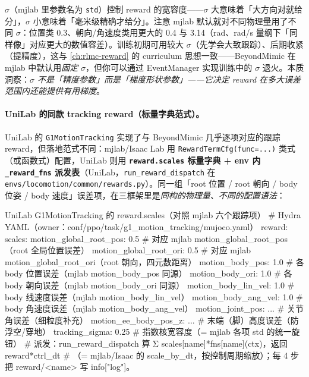 \begin{insight}\label{ins:rlmc-imit-sigma}
$\sigma$（mjlab 里参数名为 \texttt{std}）控制 reward 的宽容度——$\sigma$ 大意味着「大方向对就给分」，$\sigma$ 小意味着「毫米级精确才给分」。注意 mjlab 默认就对不同物理量用了不同 $\sigma$：位置类 0.3、朝向/角速度类用更大的 0.4 与 3.14（rad、rad/s 量纲下「同样像」对应更大的数值容差）。训练初期可用较大 $\sigma$（先学会大致跟踪）、后期收紧（提精度），这与 \cref{ch:rlmc-reward} 的 curriculum 思想一致——BeyondMimic 在 mjlab 中默认用\emph{固定} $\sigma$，但你可以通过 EventManager 实现训练中的 $\sigma$ 退火。本质洞察：\emph{$\sigma$ 不是「精度参数」而是「梯度形状参数」——它决定 reward 在多大误差范围内还能提供有用梯度}。
\end{insight}

\paragraph{UniLab 的同款 tracking reward（标量字典范式）。}UniLab 的 \verb|G1MotionTracking| 实现了与 BeyondMimic 几乎逐项对应的跟踪 reward，但落地范式不同：mjlab/Isaac Lab 用 \verb|RewardTermCfg(func=...)| 类式（或函数式）配置，UniLab 则用 \textbf{\texttt{reward.scales} 标量字典 + env 内 \texttt{\_reward\_fns} 派发表}（UniLab，\verb|run_reward_dispatch| 在 \verb|envs/locomotion/common/rewards.py|）。同一组「root 位置 / root 朝向 / body 位姿 / body 速度」误差项，在三框架里是\emph{同构的物理量、不同的配置语法}：

\begin{codebox}[Python]{UniLab G1MotionTracking 的 reward.scales（对照 mjlab 六个跟踪项）}
# Hydra YAML（owner：conf/ppo/task/g1_motion_tracking/mujoco.yaml）
reward:
  scales:
    motion_global_root_pos: 0.5    # 对应 mjlab motion_global_root_pos（root 全局位置误差）
    motion_global_root_ori: 0.5    # 对应 mjlab motion_global_root_ori（root 朝向，四元数距离）
    motion_body_pos:        1.0    # 各 body 位置误差（mjlab motion_body_pos 同源）
    motion_body_ori:        1.0    # 各 body 朝向误差（mjlab motion_body_ori 同源）
    motion_body_lin_vel:    1.0    # body 线速度误差（mjlab motion_body_lin_vel）
    motion_body_ang_vel:    1.0    # body 角速度误差（mjlab motion_body_ang_vel）
    motion_joint_pos:       ...    # 关节角误差（细粒度补充）
    motion_ee_body_pos_z:   ...    # 末端（脚）高度误差（防浮空/穿地）
  tracking_sigma: 0.25             # 指数核宽容度（= mjlab 各项 std 的统一旋钮）
# 派发：run_reward_dispatch 算 Σ scales[name]*fns[name](ctx)，返回 reward*ctrl_dt
#   （= mjlab/Isaac 的 scale_by_dt，按控制周期缩放）；每 4 步把 reward/<name> 写 info["log"]。
\end{codebox}

